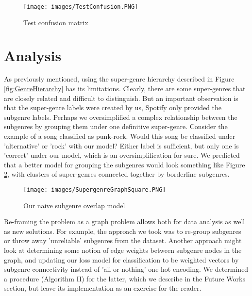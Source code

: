 \documentclass[conference]{IEEEtran}
\begin{document}
\begin{figure}[htbp]
\centerline{\texttt{[image: images/TestConfusion.PNG]}}
\caption{Test confusion matrix}
\label{fig:TestConfusion}
\end{figure}

\section{Analysis}
As previously mentioned, using the super-genre hierarchy described in Figure \ref{fig:GenreHierarchy} has its limitations. Clearly, there are some super-genres that are closely related and difficult to distinguish. But an important observation is that the super-genre labels were created by us, Spotify only provided the subgenre labels. Perhaps we oversimplified a complex relationship between the subgenres by grouping them under one definitive super-genre. Consider the example of a song classified as punk-rock. Would this song be classified under 'alternative' or 'rock' with our model? Either label is sufficient, but only one is 'correct' under our model, which is an oversimplification for sure. We predicted that a better model for grouping the subgenres would look something like Figure \ref{fig:NaiveOverlap}, with clusters of super-genres connected together by borderline subgenres.

\begin{figure}[htbp]
\centerline{\texttt{[image: images/SupergenreGraphSquare.PNG]}}
\caption{Our naive subgenre overlap model}
\label{fig:NaiveOverlap}
\end{figure}

Re-framing the problem as a graph problem allows both for data analysis as well as new solutions. For example, the approach we took was to re-group subgenres or throw away 'unreliable' subgenres from the dataset. Another approach might look at determining some notion of edge weights between subgenre nodes in the graph, and updating our loss model for classification to be weighted vectors by subgenre connectivity instead of 'all or nothing' one-hot encoding. We determined a procedure (Algorithm II) for the latter, which we describe in the Future Works section, but leave its implementation as an exercise for the reader.
\end{document}

